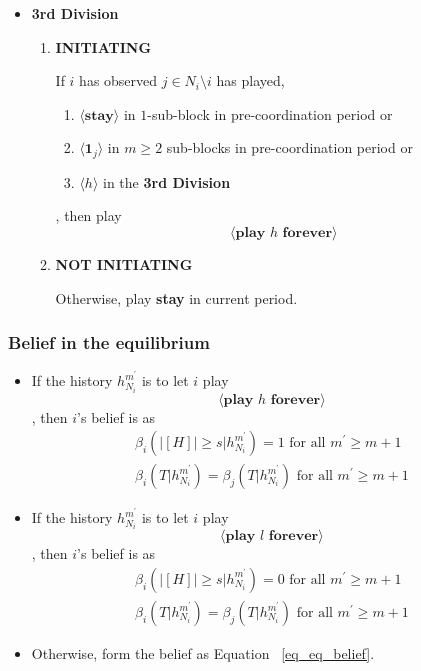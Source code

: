 \documentclass[12pt]{article}
\theoremstyle{remark}
\theoremstyle{remark}
\begin{document}
\begin{itemize}
\begin{itemize}
\begin{itemize}
\end{itemize}

\end{itemize}



\item \textbf{3rd Division} 

\begin{enumerate}
\item \textbf{INITIATING} 

If $i$ has observed $j\in N_i\setminus i$ has played,
\begin{enumerate}
\item $\langle \textbf{stay} \rangle$ in $1$-sub-block in pre-coordination period or
\item $\langle \mathbf{1}_j \rangle$ in $m\geq 2$ sub-blocks in pre-coordination period or
\item $\langle h \rangle$ in the \textbf{3rd Division} 
\end{enumerate}
, then play
\[\langle \textbf{play $h$ forever} \rangle\]
\item \textbf{NOT INITIATING} 

Otherwise, play 
\textbf{stay} 
in current period.
\end{enumerate}
\end{itemize}






\subsubsection{Belief in the equilibrium}
\begin{itemize}
\item If the history $h^{m^{'}}_{N_i}$ is to let $i$ play 
\[\langle \textbf{play $h$ forever} \rangle\]
, then $i$'s belief is as
\begin{eqnarray}
\beta_{i}(|[H]|\geq s|h^{m^{'}}_{N_i})=1 \text{ for all $m^{'}\geq m+1$} \label{eq_belief_success_1}\\
\beta_{i}(T|h^{m^{'}}_{N_i})=\beta_{j}(T|h^{m^{'}}_{N_i}) \text{ for all $m^{'}\geq m+1$} \label{eq_belief_success_2}
\end{eqnarray}

\item If the history $h^{m^{'}}_{N_i}$ is to let $i$ play 
\[\langle \textbf{play $l$ forever} \rangle\]
, then $i$'s belief is as
\begin{eqnarray}
\beta_{i}(|[H]|\geq s|h^{m^{'}}_{N_i})=0 \text{ for all $m^{'}\geq m+1$} \label{eq_belief_fail_1}\\
\beta_{i}(T|h^{m^{'}}_{N_i})=\beta_{j}(T|h^{m^{'}}_{N_i}) \text{ for all $m^{'}\geq m+1$} \label{eq_belief_fail_2}
\end{eqnarray}

\item Otherwise, form the belief as Equation ~\ref{eq_eq_belief}.
\end{itemize}
\end{document}
